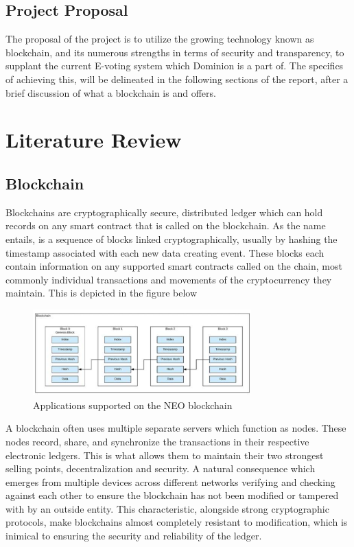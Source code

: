 \documentclass{article}
\begin{document}
\subsection{Project Proposal}
The proposal of the project is to utilize the growing technology known as blockchain, and its numerous strengths in terms of security and transparency, to supplant the current E-voting system which Dominion is a part of. The specifics of achieving this, will be delineated in the following sections of the report, after a brief discussion of what a blockchain is and offers.      

\section{Literature Review}

\subsection{Blockchain}
Blockchains are cryptographically secure,  distributed ledger which can hold records on any smart contract that is called on the blockchain. As the name entails, is a sequence of blocks linked cryptographically, usually by hashing the timestamp associated with each new data creating event.\cite{hawk1} These blocks each contain information on any supported smart contracts called on the chain, most commonly individual transactions and movements of the cryptocurrency they maintain. This is depicted in the figure below
\begin{figure}[ht!]
    \centering
    \includegraphics[width=0.75\textwidth]{blockchain.PNG}
    \caption{Applications supported on the NEO blockchain}
\end{figure}
\smallbreak \noindent
A blockchain often uses multiple separate servers which function as nodes. These nodes record, share, and synchronize the transactions in their respective electronic ledgers. This is what allows them to maintain their two strongest selling points, decentralization and security. A natural consequence which emerges from multiple devices across different networks verifying and checking against each other to ensure the blockchain has not been modified or tampered with by an outside entity.\cite{hawk1} This characteristic, alongside strong cryptographic protocols, make blockchains almost completely resistant to modification, which is inimical to ensuring the security and reliability of the ledger. 
\end{document}
